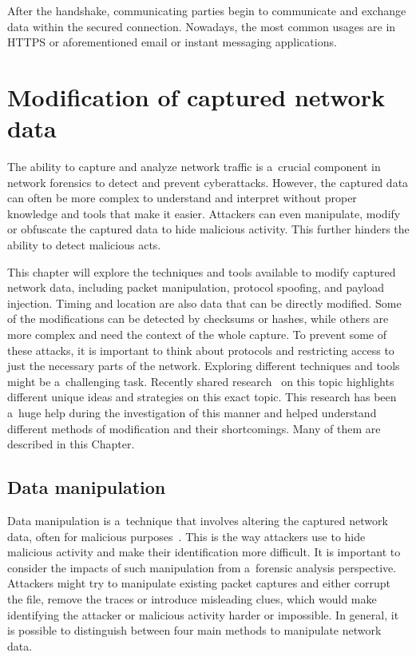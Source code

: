 \documentclass[
  printed,     %
  color,       %
  oneside,     %
  nosansbold,  %
  nocolorbold, %
  nolof,         %
  nolot,         %
]{fithesis4}
\begin{document}
After the handshake, communicating parties begin to communicate and exchange data within the secured connection. Nowadays, the most common usages are in HTTPS or aforementioned email or instant messaging applications.



\newpage
\chapter{Modification of captured network data}
\label{chap:modif}

The ability to capture and analyze network traffic is a~crucial component in network forensics to detect and prevent cyberattacks. However, the captured data can often be more complex to understand and interpret without proper knowledge and tools that make it easier. Attackers can even manipulate, modify or obfuscate the captured data to hide malicious activity. This further hinders the ability to detect malicious acts.

This chapter will explore the techniques and tools available to modify captured network data, including packet manipulation, protocol spoofing, and payload injection. Timing and location are also data that can be directly modified. Some of the modifications can be detected by checksums or hashes, while others are more complex and need the context of the whole capture. To prevent some of these attacks, it is important to think about protocols and restricting access to just the necessary parts of the network. Exploring different techniques and tools might be a~challenging task. Recently shared research~\cite{Howcanne5:online} on this topic highlights different unique ideas and strategies on this exact topic. This research has been a~huge help during the investigation of this manner and helped understand different methods of modification and their shortcomings. Many of them are described in this Chapter.

\section{Data manipulation}
\label{sec:manipul}
Data manipulation is a~technique that involves altering the captured network data, often for malicious purposes~\cite{Messier2017-fz}. This is the way attackers use to hide malicious activity and make their identification more difficult. It is important to consider the impacts of such manipulation from a~forensic analysis perspective. Attackers might try to manipulate existing packet captures and either corrupt the file, remove the traces or introduce misleading clues, which would make identifying the attacker or malicious activity harder or impossible. In general, it is possible to distinguish between four main methods to manipulate network data.
\end{document}

